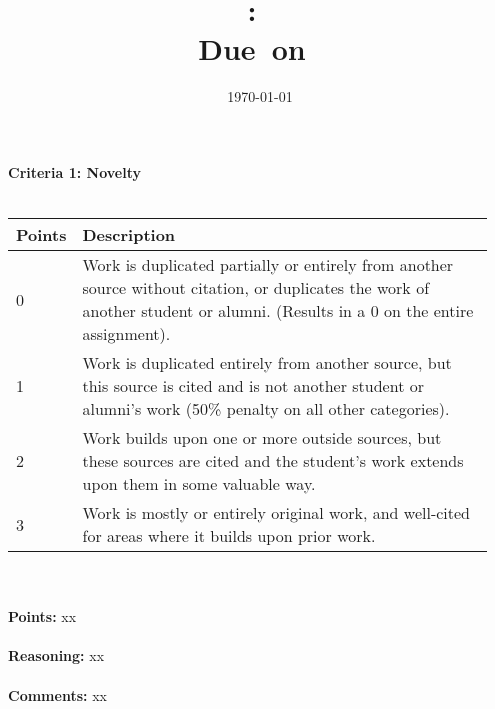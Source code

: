 \documentclass{article}
\title{
    \vspace{2in}
    \textmd{\textbf{\ReviewClass:\ \ReviewTitle}}\\
    \normalsize\vspace{0.1in}\small{Due\ on\ \ReviewDueDate}\\
    \vspace{3in}
}
\author{\ReviewAuthorName}
\date{\today}
\begin{document}
\maketitle
\pagebreak


\textbf{\large Criteria 1: Novelty} \\
\hspace{1cm} \\
\begin{tabular}{|p{0.075\linewidth}||p{0.875\linewidth}|}
    \hline
    \textbf{Points} & \textbf{Description} \\
    \hline
    \hline
    0      & Work is duplicated partially or entirely from another source without citation, or duplicates the work of another student or alumni. (Results in a 0 on the entire assignment). \\
    \hline
    1      & Work is duplicated entirely from another source, but this source is cited and is not another student or alumni’s work (50\% penalty on all other categories). \\
    \hline
    2      & Work builds upon one or more outside sources, but these sources are cited and the student’s work extends upon them in some valuable way. \\
    \hline
    3      & Work is mostly or entirely original work, and well-cited for areas where it builds upon prior work. \\
    \hline
\end{tabular} \\

\hspace{1cm} \\
\textbf{\large Points: } xx \\

\hspace{1cm} \\
\textbf{\large Reasoning: } xx \\

\hspace{1cm} \\
\textbf{\large Comments: } xx \\

\pagebreak
\end{document}
